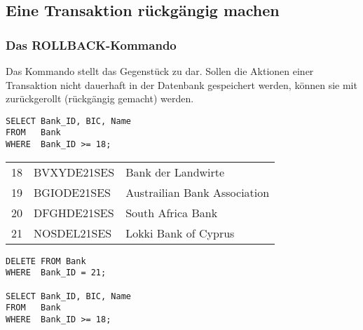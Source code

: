 \subsection{Eine Transaktion rückgängig machen}
\subsubsection{Das ROLLBACK-Kommando}
Das Kommando \ROLLBACK{} stellt das Gegenstück zu \COMMIT{} dar.
Sollen die Aktionen einer Transaktion nicht dauerhaft in der Datenbank
gespeichert werden, können sie mit \ROLLBACK{} zurückgerollt
(rückgängig gemacht) werden.
\begin{lstlisting}[language=oracle_sql,caption={Eine Transaktion wird abgebrochen},label=sql07_28]
SELECT Bank_ID, BIC, Name
FROM   Bank
WHERE  Bank_ID >= 18;
          \end{lstlisting}
\begin{center}
    \begin{small}
        \tablehead{}
        \begin{msoraclesql}
            \begin{supertabular}{rll}
                18 & BVXYDE21SES & Bank der Landwirte \\
                19 & BGIODE21SES & Austrailian Bank Association \\
                20 & DFGHDE21SES & South Africa Bank \\
                21 & NOSDEL21SES & Lokki Bank of Cyprus \\
            \end{supertabular}
        \end{msoraclesql}
    \end{small}
\end{center}
\clearpage
\begin{lstlisting}[language=oracle_sql,label=sql07_29]
DELETE FROM Bank
WHERE  Bank_ID = 21;

SELECT Bank_ID, BIC, Name
FROM   Bank
WHERE  Bank_ID >= 18;
          \end{lstlisting}
